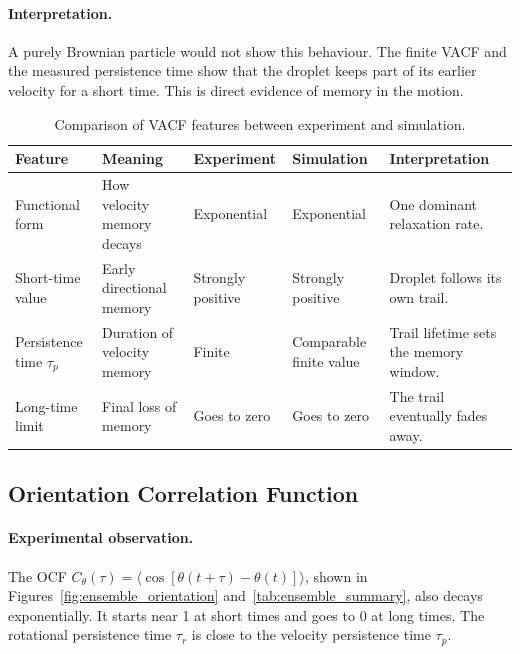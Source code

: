 \paragraph{Interpretation.}
A purely Brownian particle would not show this behaviour. The finite VACF and the measured persistence time show that the droplet keeps part of its earlier velocity for a short time. This is direct evidence of memory in the motion.

\begin{table}[htbp]
\centering
\caption{Comparison of VACF features between experiment and simulation.}
\label{tab:vacf_comparison}
\renewcommand{\arraystretch}{1.25}
\begin{tabular}{p{2.4cm} p{3.0cm} p{2.3cm} p{2.3cm} p{3.2cm}}
\hline\hline
\textbf{Feature} & \textbf{Meaning} & \textbf{Experiment} & \textbf{Simulation} & \textbf{Interpretation} \\
\hline
Functional form & How velocity memory decays & Exponential & Exponential & One dominant relaxation rate. \\[4pt]
Short-time value & Early directional memory & Strongly positive & Strongly positive & Droplet follows its own trail. \\[4pt]
Persistence time $\tau_p$ & Duration of velocity memory & Finite & Comparable finite value & Trail lifetime sets the memory window. \\[4pt]
Long-time limit & Final loss of memory & Goes to zero & Goes to zero & The trail eventually fades away. \\
\hline\hline
\end{tabular}
\end{table}

\subsection{Orientation Correlation Function}
\label{subsec:comp_ocf}

\paragraph{Experimental observation.}
The OCF $C_{\theta}(\tau)=\langle \cos[\theta(t+\tau)-\theta(t)] \rangle$, shown in Figures~\ref{fig:ensemble_orientation} and~\ref{tab:ensemble_summary}, also decays exponentially. It starts near 1 at short times and goes to 0 at long times. The rotational persistence time $\tau_r$ is close to the velocity persistence time $\tau_p$.


